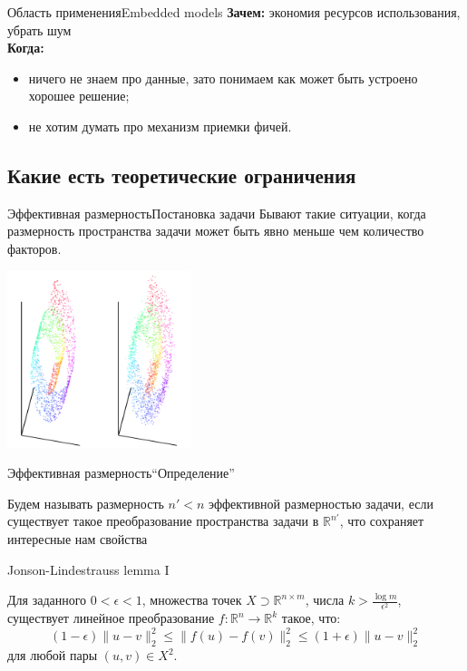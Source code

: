 \documentclass[14pt, fleqn, xcolor={dvipsnames, table}]{beamer}
\begin{document}
\begin{frame}{Область применения}{Embedded models}
\textbf{Зачем:} экономия ресурсов использования, убрать шум \\
\textbf{Когда:}
\begin{itemize}
  \item ничего не знаем про данные, зато понимаем как может быть устроено хорошее решение;
  \item не хотим думать про механизм приемки фичей.
\end{itemize}
\end{frame}

\subsection{Какие есть теоретические ограничения}
\begin{frame}{Эффективная размерность}{Постановка задачи}
Бывают такие ситуации, когда размерность пространства задачи может быть явно меньше чем количество факторов.
\begin{center}
\includegraphics[width=0.4\textwidth]{swiss-roll.png}
\end{center}
\end{frame}
\begin{frame}{Эффективная размерность}{``Определение''}
\begin{definition}
Будем называть размерность $n' < n$ эффективной размерностью задачи, если существует такое преобразование пространства задачи в $\mathbb{R}^{n'}$, что сохраняет интересные нам свойства
\end{definition}
\end{frame}

\begin{frame}{Jonson-Lindestrauss lemma I}
\begin{theorem}{}
Для заданного $0<\epsilon<1$, множества точек $X \supset \mathbb{R}^{n\times m}$, числа $k > \frac{\log m}{\epsilon^2}$, существует линейное преобразование $f: \mathbb{R}^n \to \mathbb{R}^k$ такое, что:
$$
(1 - \epsilon) \|u - v\|_2^2 \le \|f(u) - f(v)\|_2^2 \le (1 + \epsilon) \|u - v\|_2^2
$$
для любой пары $(u,v) \in X^2$.
\end{theorem}
\end{frame}
\end{document}
